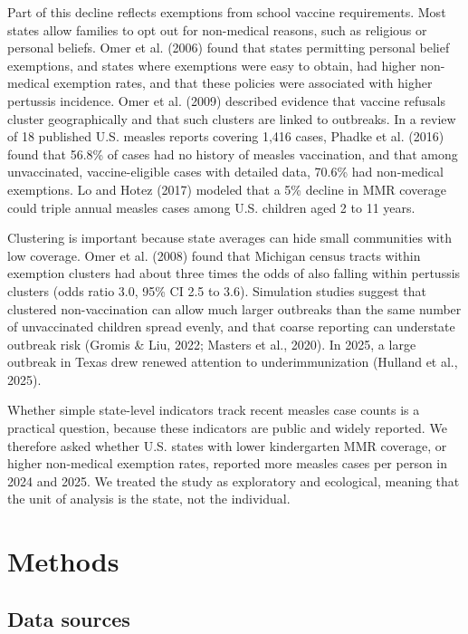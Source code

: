 \documentclass[12pt]{article}
\begin{document}
Part of this decline reflects exemptions from school vaccine requirements. Most states allow families to opt out for non-medical reasons, such as religious or personal beliefs. Omer et al. (2006) found that states permitting personal belief exemptions, and states where exemptions were easy to obtain, had higher non-medical exemption rates, and that these policies were associated with higher pertussis incidence. Omer et al. (2009) described evidence that vaccine refusals cluster geographically and that such clusters are linked to outbreaks. In a review of 18 published U.S. measles reports covering 1,416 cases, Phadke et al. (2016) found that 56.8\% of cases had no history of measles vaccination, and that among unvaccinated, vaccine-eligible cases with detailed data, 70.6\% had non-medical exemptions. Lo and Hotez (2017) modeled that a 5\% decline in MMR coverage could triple annual measles cases among U.S. children aged 2 to 11 years.

Clustering is important because state averages can hide small communities with low coverage. Omer et al. (2008) found that Michigan census tracts within exemption clusters had about three times the odds of also falling within pertussis clusters (odds ratio 3.0, 95\% CI 2.5 to 3.6). Simulation studies suggest that clustered non-vaccination can allow much larger outbreaks than the same number of unvaccinated children spread evenly, and that coarse reporting can understate outbreak risk (Gromis \& Liu, 2022; Masters et al., 2020). In 2025, a large outbreak in Texas drew renewed attention to underimmunization (Hulland et al., 2025).

Whether simple state-level indicators track recent measles case counts is a practical question, because these indicators are public and widely reported. We therefore asked whether U.S. states with lower kindergarten MMR coverage, or higher non-medical exemption rates, reported more measles cases per person in 2024 and 2025. We treated the study as exploratory and ecological, meaning that the unit of analysis is the state, not the individual.

\section*{Methods}
\subsection*{Data sources}
\end{document}

